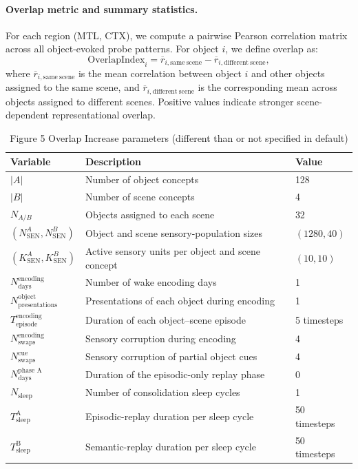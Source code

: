 \documentclass{article}
\begin{document}
\paragraph{Overlap metric and summary statistics.}
For each region (MTL, CTX), we compute a pairwise Pearson correlation matrix across all object-evoked probe patterns. For object $i$, we define overlap as:
\begin{equation}
\mathrm{OverlapIndex}_i
=
\overline{r}_{i,\mathrm{same\ scene}}
-
\overline{r}_{i,\mathrm{different\ scene}},
\end{equation}
where $\overline{r}_{i,\mathrm{same\ scene}}$ is the mean correlation between object $i$ and other objects assigned to the same scene, and $\overline{r}_{i,\mathrm{different\ scene}}$ is the corresponding mean across objects assigned to different scenes. Positive values indicate stronger scene-dependent representational overlap.
\begin{table}[h!]
\centering
\caption{Figure 5 Overlap Increase parameters (different than or not specified in default)}
\label{tab:overlap_reproduction_parameters}
\begin{tabular}{lll}
\toprule
\textbf{Variable} & \textbf{Description} & \textbf{Value} \\
\midrule
$|A|$ & Number of object concepts & 128 \\
$|B|$ & Number of scene concepts & 4 \\
$N_{A/B}$ & Objects assigned to each scene & 32 \\
$(N_{\textrm{SEN}}^A, N_{\textrm{SEN}}^B)$ & Object and scene sensory-population sizes & $(1280, 40)$ \\
$(K_{\textrm{SEN}}^A, K_{\textrm{SEN}}^B)$ & Active sensory units per object and scene concept & $(10, 10)$ \\
\midrule
$N_{\textrm{days}}^{\textrm{encoding}}$ & Number of wake encoding days & 1 \\
$N_{\textrm{presentations}}^{\textrm{object}}$ & Presentations of each object during encoding & 1 \\
$T_{\textrm{episode}}^{\textrm{encoding}}$ & Duration of each object--scene episode & 5 timesteps \\
$N_{\textrm{swaps}}^{\textrm{encoding}}$ & Sensory corruption during encoding & 4 \\
$N_{\textrm{swaps}}^{\textrm{cue}}$ & Sensory corruption of partial object cues & 4 \\
\midrule
$N_{\textrm{days}}^{\textrm{phase A}}$ & Duration of the episodic-only replay phase & 0 \\
$N_{\textrm{sleep}}$ & Number of consolidation sleep cycles & 1 \\
$T_{\textrm{sleep}}^{\textrm{A}}$ & Episodic-replay duration per sleep cycle & 50 timesteps \\
$T_{\textrm{sleep}}^{\textrm{B}}$ & Semantic-replay duration per sleep cycle & 50 timesteps \\
\bottomrule
\end{tabular}
\end{table}
\end{document}
